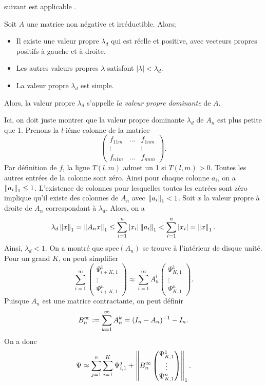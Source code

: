 suivant est applicable \cite[Th\'eor\`eme 8.4.4]{matrix}.
\begin{thm}
	Soit $A$ une matrice non n\'egative et irr\'eductible. Alors;
	\begin{itemize}
		\item Il existe une valeur propre $\lambda_{d}$ qui est r\'eelle et positive, avec vecteurs propres positifs \`a gauche et \`a droite.
		\item Les autres valeurs propres $\lambda$ satisfont $\vert\lambda\vert < \lambda_{d}$.
		\item La valeur propre $\lambda_{d}$ est simple.
	\end{itemize}
	Alors, la valeur propre $\lambda_{d}$ s'appelle \textit{la valeur propre dominante} de $A$.
\end{thm}
Ici, on doit juste montrer que la valeur propre dominante $\lambda_{d}$ de
$A_{n}$ est plus petite que 1. Prenons la $l$-i\'eme colonne de la matrice
\[ \begin{pmatrix}
f_{11m} & \ldots & f_{1nm} \\
\vdots &  & \vdots \\
f_{n1m} & \ldots & f_{nnm} 
\end{pmatrix}.\]
Par d\'efinition de $f$, la ligne $T(l,m)$ admet un 1 si $T(l,m) > 0$. Toutes
les autres entr\'ees de la colonne sont z\'ero. Ainsi pour chaque colonne
$a_{i}$, on a $\left\lVert a_{i}\right\rVert_{1}\le1$. L'existence de colonnes pour lesquelles toutes
les entr\'ees sont z\'ero implique qu'il existe des colonnes de $A_{n}$ avec
$\left\lVert a_{i}\right\rVert_{1}<1$. Soit $x$ la valeur propre \`a droite de $A_{n}$
correspondant \`a $\lambda_{d}$. Alors, on a
\[
	\lambda_{d} \left\lVert x\right\rVert_{1} = \left\lVert A_{n}x\right\rVert_{1} \le \sum_{i=1}^{n}\vert x_{i}\vert  \left\lVert a_{i}\right\rVert_{1} < \sum_{i=1}^{n}\vert x_{i}\vert  = \left\lVert x\right\rVert_{1}.
\]
Ainsi, $\lambda_{d} < 1$. On a montr\'e que spec$(A_{n})$ se trouve \`a
l'int\'erieur de disque unit\'e. Pour un grand $K$, on peut simplifier
\[
	\sum_{i=1}^{\infty}  
	\begin{pmatrix}
		\Psi_{i+K,1}^1 \\
		\vdots \\
		\Psi_{i+K,1}^n 
	\end{pmatrix} \approx \sum_{i=1}^{\infty} A_{n}^{i}
	\begin{pmatrix}
		\Psi_{K,1}^1 \\
		\vdots \\
		\Psi_{K,1}^n 
	\end{pmatrix}.
\]
Puisque $A_{n}$ est une matrice contractante, on peut d\'efinir
\[
	B_{n}^{\infty}\vcentcolon=\sum_{k=1}^{\infty}A_{n}^{k}=(I_{n}- A_{n})^{-1}-I_{n}.
\]
On a donc
\begin{equation}
	\Psi \approx \sum_{j=1}^{n}\sum_{i=1}^{K}\Psi_{i,1}^{j} + \left\lVert B_{n}^{\infty}
	\begin{pmatrix}
		\Psi_{K,1}^1 \\
		\vdots \\
		\Psi_{K,1}^n 
	\end{pmatrix}
	\right\rVert_{1}.
	\label{eq:approx}
\end{equation}
